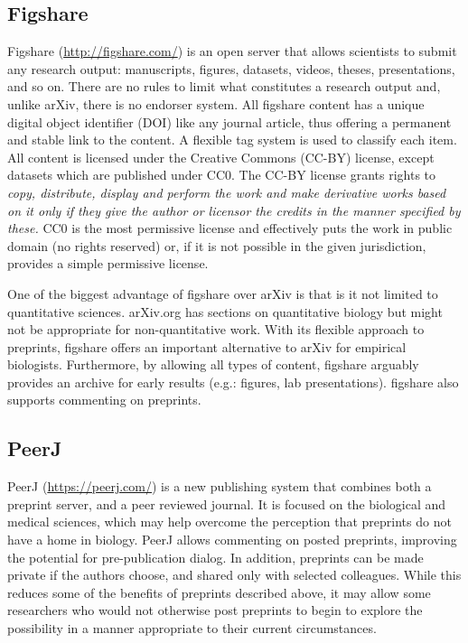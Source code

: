 \documentclass[letterpaper,twocolumn,superscriptaddress,showkeys,longbibliography]{revtex4-1}
\begin{document}
\subsection{Figshare}

Figshare (\href{http://figshare.com/}{http://figshare.com/}) is an open server
that allows scientists to submit any research output: manuscripts, figures,
datasets, videos, theses, presentations, and so on. There are no rules to limit
what constitutes a research output and, unlike arXiv, there is no endorser
system. All figshare content has a unique digital object identifier (DOI) like
any journal article, thus offering a permanent and stable link to the content.
A flexible tag system is used to classify each item. All content
is licensed under the Creative Commons (CC-BY) license, except
datasets which are published under CC0. The CC-BY license grants rights to
\emph{copy, distribute, display and perform the work and make derivative works
based on it only if they give the author or licensor the credits in the manner
specified by these.}  CC0 is the most permissive license and effectively puts
the work in public domain (no rights reserved) or, if it is not possible in the
given jurisdiction, provides a simple permissive license.

One of the biggest advantage of figshare over arXiv is that is it not limited to
quantitative sciences. arXiv.org has sections on quantitative biology but might
not be appropriate for non-quantitative work. With its flexible approach to
preprints, figshare offers an important alternative to arXiv for empirical
biologists. Furthermore, by allowing all types of content, figshare arguably
provides an archive for early results (e.g.: figures, lab presentations).
figshare also supports commenting on preprints.

\subsection{PeerJ}

PeerJ (\href{https://peerj.com/}{https://peerj.com/}) is a new publishing system
that combines both a preprint server, and a peer reviewed journal.  It is
focused on the biological and medical sciences, which may help overcome the
perception that preprints do not have a home in biology.  PeerJ allows
commenting on posted preprints, improving the potential for pre-publication
dialog. In addition, preprints can be made private if the authors choose, and
shared only with selected colleagues. While this reduces some of the benefits of
preprints described above, it may allow some researchers who would not otherwise
post preprints to begin to explore the possibility in a manner appropriate to
their current circumstances.
\end{document}
